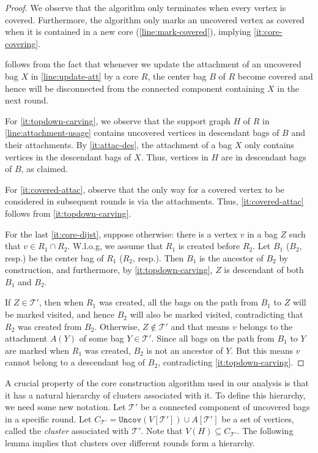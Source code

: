 \documentclass{theoretics}
\newcommand{\mt}{\mathcal{T}}
\def\uncovset{\mathtt{Uncov}}
\def\core{R}
\begin{document}
\begin{proof}
	
	We observe that the algorithm only terminates when every vertex is covered. Furthermore, the algorithm only marks an uncovered vertex as covered when it is contained in a new core (\cref{line:mark-covered}), implying \cref{it:core-covering}. 
	
	 follows from the fact that whenever we update the attachment of an uncovered bag $X$ in \cref{line:update-att} by a core $R$, the center bag $B$ of $R$ become covered and hence will be disconnected from the connected component containing $X$ in the next round. 
	
	For \cref{it:topdown-carving}, we observe that the support graph $H$ of $R$ in \cref{line:attachment-usage} contains uncovered vertices in descendant bags of $B$ and their attachments. By \cref{it:attac-des}, the attachment of a bag $X$ only contains vertices in the descendant bags of $X$. Thus, vertices in $H$ are in descendant bags of $B$, as claimed.
	
	For \cref{it:covered-attac}, observe that the only way for a covered vertex to be considered in subsequent rounds is via the attachments. Thus, \cref{it:covered-attac} follows from \cref{it:topdown-carving}. 
	
	For the last \cref{it:core-dijst}, suppose otherwise: there is a vertex $v$ in a bag $Z$ such that $v\in \core_1\cap\core_2$. W.l.o.g, we assume that $\core_1$ is created before $\core_2$. Let $B_1$ ($B_2$, resp.) be the center bag of $\core_1$ ($\core_2$, resp.). Then $B_1$ is the ancestor of $B_2$ by construction, and furthermore, by \cref{it:topdown-carving},  $Z$ is descendant of both $B_1$ and $B_2$. 
	
	If $Z \in \mt'$, then when $\core_1$ was created, all the bags on the path from $B_1$ to $Z$ will be marked visited, and hence $B_2$ will also be marked visited, contradicting that $\core_2$ was created from $B_2$. Otherwise, $Z \not \in \mt'$ and that means $v$ belongs to the attachment $A(Y)$ of some bag $Y\in \mt'$. Since all bags on the path from $B_1$ to $Y$ are marked when $\core_1$ was created, $B_2$ is not an ancestor of $Y$. But this means $v$ cannot belong to a descendant bag of $B_2$, contradicting \cref{it:topdown-carving}. 
\end{proof}

A crucial property of the core construction algorithm used in our analysis is that it has a natural hierarchy of clusters associated with it. To define this hierarchy, we need some new notation.  Let $\mt'$ be a connected component of uncovered bags in a specific round. Let $C_{\mt'} = \uncovset(V[\mt']) \cup A[\mt']$ be a set of vertices, called the \emph{cluster} associated with $\mt'$. Note that $V(H)\subseteq C_{\mt'}$. The following lemma implies that clusters over different rounds form a hierarchy.
\end{document}
